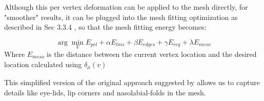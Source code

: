 Although this per vertex deformation can be applied to the mesh directly, for "smoother" results, it can be plugged into the mesh fitting optimization as described in Sec 3.3.4 , so that the mesh fitting energy becomes: 

 $$ \arg \min_{V}  E_{pcl} + \alpha E_{lms} + \beta E_{edges} +  \gamma E_{reg} + \lambda E_{meso} $$
 Where $E_{meso}$ is the distance between the current vertex location and the desired location calculated using $\delta_{\mu}(v)$

This simplified version of the original approach suggested by \cite{beeler2010high} allows us to capture details like eye-lids, lip corners and nasolabial-folds in the mesh.


